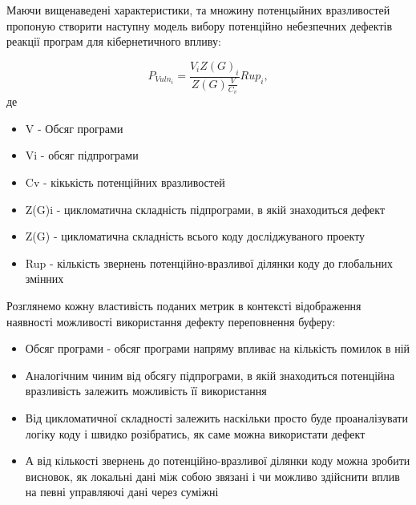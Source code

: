 Маючи вищенаведені характеристики, та множину потенцыйних вразливостей пропоную створити наступну модель вибору потенційно небезпечних дефектів реакції програм для кібернетичного впливу:

\begin{equation}
 P_{Vuln_i} = \frac{V_i Z(G)_i}{Z(G) \frac{V}{C_v}}Rup_i, 
\end{equation}
де

\begin{itemize}
\item {} 
V - Обсяг програми

\item {} 
Vi - обсяг підпрограми

\item {} 
Cv - кікькість потенційних вразливостей

\item {} 
Z(G)i - цикломатична складність підпрограми, в якій знаходиться дефект

\item {} 
Z(G) - цикломатична складність всього коду досліджуваного проекту

\item {} 
Rup - кількість звернень потенційно-вразливої ділянки коду до глобальних змінних

\end{itemize}

Розглянемо кожну властивість поданих метрик в контексті відображення наявності можливості використання дефекту переповнення буферу:
\begin{itemize}
\item {} 
Обсяг програми - обсяг програми напряму впливає на кількість помилок в ній

\item {} 
Аналогічним чиним від обсягу підпрограми, в якій знаходиться потенційна вразливість залежить можливість її використання

\item {} 
Від цикломатичної складності залежить наскільки просто буде проаналізувати логіку коду і швидко розібратись, як саме можна використати дефект

\item {} 
А від кількості звернень до потенційно-вразливої ділянки коду можна зробити висновок, як локальні дані між собою звязані і чи можливо здійснити вплив на певні управляючі дані через суміжні

\end{itemize}

